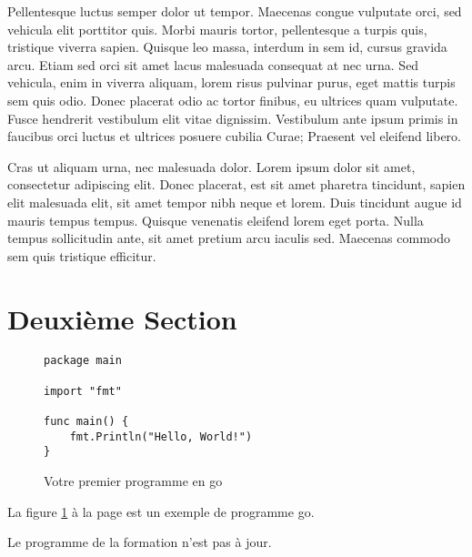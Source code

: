 \documentclass[11pt,a4paper]{article}
\begin{document}
Pellentesque luctus semper dolor ut tempor. Maecenas congue vulputate orci, sed vehicula elit porttitor quis. Morbi mauris tortor, pellentesque a turpis quis, tristique viverra sapien. Quisque leo massa, interdum in sem id, cursus gravida arcu. Etiam sed orci sit amet lacus malesuada consequat at nec urna. Sed vehicula, enim in viverra aliquam, lorem risus pulvinar purus, eget mattis turpis sem quis odio. Donec placerat odio ac tortor finibus, eu ultrices quam vulputate. Fusce hendrerit vestibulum elit vitae dignissim. Vestibulum ante ipsum primis in faucibus orci luctus et ultrices posuere cubilia Curae; Praesent vel eleifend libero.
\newline

Cras ut aliquam urna, nec malesuada dolor. Lorem ipsum dolor sit amet, consectetur adipiscing elit. Donec placerat, est sit amet pharetra tincidunt, sapien elit malesuada elit, sit amet tempor nibh neque et lorem. Duis tincidunt augue id mauris tempus tempus. Quisque venenatis eleifend lorem eget porta. Nulla tempus sollicitudin ante, sit amet pretium arcu iaculis sed. Maecenas commodo sem quis tristique efficitur.


\section{Deuxième Section}
\begin{figure}
\begin{lstlisting}
package main

import "fmt"

func main() {
	fmt.Println("Hello, World!")
}
\end{lstlisting}
\caption{Votre premier programme en go}
\label{code:sample1}
\end{figure}

La figure \ref{code:sample1} à la page \pageref{code:sample1} est un exemple de programme go.

Le programme de la formation n'est pas à jour\cite{fil}.



\end{document}
